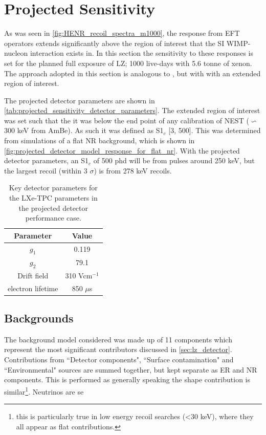 \section{Projected Sensitivity}
\par
As was seen in \autoref{fig:HENR_recoil_spectra_m1000}, the response from EFT operators extends significantly above the region of interest that the SI WIMP-nucleon interaction exists in.
In this section the sensitivity to these responses is set for the planned full exposure of LZ; 1000 live-days with 5.6 tonne of xenon.
The approach adopted in this section is analogous to \cite{LZ_projected_sensitivity_paper_ref}, but with with an extended region of interest.
\par
The projected detector parameters are shown in \autoref{tab:projected_sensitivity_detector_parameters}.
The extended region of interest was set such that the it was below the end point of any calibration of NEST ($\backsim$ 300 keV from AmBe).
As such it was defined as S1$_c$ [3, 500].
This was determined from simulations of a flat NR background, which is shown in \autoref{fig:projected_detector_model_response_for_flat_nr}.
With the projected detector parameters, an S1$_c$ of 500 phd will be from pulses around 250 keV, but the largest recoil (within 3 $\sigma$) is from 278 keV recoils.

\begin{table}[]
    \centering
    \begin{tabular}{c|c}
        Parameter   & Value  \\ \hline
        $g_{1}$     & 0.119 \\
        $g_{2}$     & 79.1  \\
        Drift field & 310 Vcm$^{-1}$ \\
        electron lifetime & 850 $\mu$s
    \end{tabular}
    \caption{Key detector parameters for the LXe-TPC parameters in the projected detector performance case.}
    \label{tab:projected_sensitivity_detector_parameters}
\end{table}



\subsection{Backgrounds}
\par
The background model considered was made up of 11 components which represent the most significant contributors discussed in \autoref{sec:lz_detector}.
Contributions from ``Detector components", ``Surface contamination" and ``Environmental" sources are summed together, but kept separate as ER and NR components.
This is performed as generally speaking the shape contribution is similar\footnote{this is particularly true in low energy recoil searches (<30 keV), where they all appear as flat contributions.}.
Neutrinos are se


